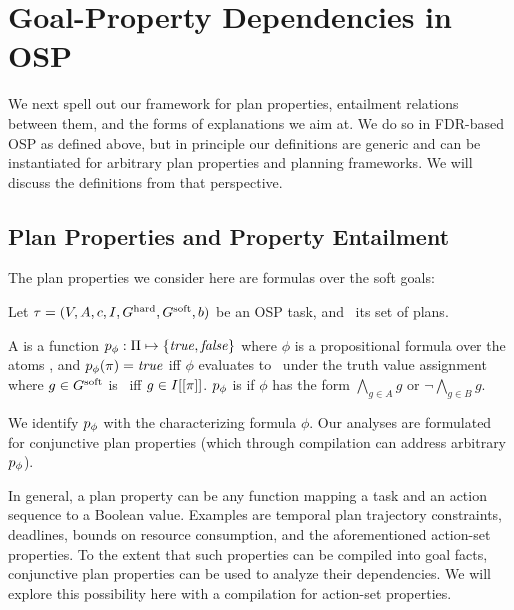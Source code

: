 \section{Goal-Property Dependencies in OSP}
\label{framework}



We next spell out our framework for plan properties, entailment
relations between them, and the forms of explanations we aim at. We do
so in FDR-based OSP as defined above, but in principle our definitions
are generic and can be instantiated for arbitrary plan properties and
planning frameworks. We will discuss the definitions from that
perspective.



\subsection{Plan Properties and Property Entailment}

The plan properties we consider here are formulas over the soft goals:

\begin{definition}
\label{def:osp-plan-properties}
Let $\tau =
(V,\allowbreak A,\allowbreak{\ensuremath{c}},\allowbreak I,\allowbreak G^{\text{\textup{hard}}},\allowbreak G^{\text{\textup{soft}}},\allowbreak{\ensuremath{b}})$
be an OSP task, and \plans\ its set of plans.

A  is a function $p_\phi : \Pi \mapsto
\{\mathit{true}, \mathit{false}\}$ where $\phi$ is a propositional formula over the
atoms \goalsoft, and $p_\phi(\pi) = \mathit{true}$ iff $\phi$ evaluates
to \true\ under the truth value assignment where $g \in G^{\text{\textup{soft}}}$ is
\true\ iff $g \in I[[\pi]]$.
%
$p_\phi$ is  if $\phi$ has the form
$\bigwedge_{g \in A} g\allowbreak$ or $\neg \bigwedge_{g \in B} g$.
\end{definition}

We identify $p_\phi$ with the characterizing formula $\phi$. Our
analyses are formulated for conjunctive plan properties (which through
compilation can address arbitrary $p_\phi$).

In general, a plan property can be any function mapping a task and an
action sequence to a Boolean value. Examples are temporal plan
trajectory constraints, deadlines, bounds on resource consumption, and
the aforementioned action-set properties. To the extent that such
properties can be compiled into goal facts, conjunctive plan
properties can be used to analyze their dependencies. We will explore
this possibility here with a compilation for action-set properties.

